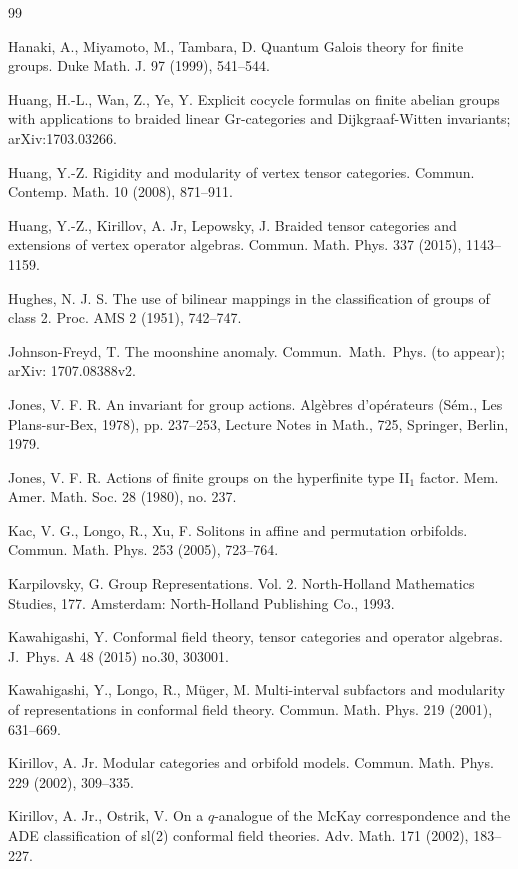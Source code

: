\documentclass[12pt]{article}
\numberwithin{equation}{section}
\begin{document}
\begin{thebibliography}{99}
\begin{scriptsize}
 {Hanaki, A., Miyamoto, M., Tambara, D.} {Quantum Galois theory for finite groups.} {Duke Math. J.} {97} (1999), 541--544.


 {Huang, H.-L., Wan, Z., Ye, Y.} {Explicit cocycle formulas on finite abelian groups with applications to braided linear Gr-categories and Dijkgraaf-Witten invariants;} arXiv:1703.03266. 

  {Huang, Y.-Z.} {Rigidity and modularity of vertex tensor categories.} {Commun. Contemp. Math.} 10 (2008), 871--911. 


 {Huang, Y.-Z., Kirillov, A. Jr, Lepowsky, J.} {Braided tensor categories and
extensions of vertex operator algebras.} Commun. Math. Phys.
337 (2015), 1143--1159. %

 {Hughes, N. J. S.} {The use of bilinear mappings in the classification of groups of class 2.} {Proc. AMS} 2 (1951), 742--747.


 {Johnson-Freyd, T.} {The moonshine anomaly.} {Commun.\ Math.\ Phys.} (to appear); arXiv: 1707.08388v2.

 {Jones, V. F. R.}  {An invariant for group actions.} {Alg\`ebres d'op\'erateurs (S\'em., Les Plans-sur-Bex, 1978),} pp. 237--253, {Lecture Notes in Math., 725, Springer, Berlin, 1979.} 

 {Jones, V. F. R.}  {Actions of finite groups on the hyperfinite type II$_1$ factor.} {Mem. Amer. Math. Soc.} 28 (1980), no. 237.


 {Kac, V. G., Longo, R., Xu, F.} {Solitons in affine and permutation orbifolds.} {Commun. Math. Phys.} {253 (2005), 723--764.}

 {Karpilovsky, G.}  {Group Representations. Vol. 2.} North-Holland Mathematics Studies, 177. Amsterdam: North-Holland Publishing Co., 1993.


 {Kawahigashi, Y.} {Conformal field theory, tensor categories and operator algebras.} {J.\ Phys. A 48} (2015) no.30, 303001. 

 {Kawahigashi, Y., Longo, R., M\"uger, M.} {Multi-interval subfactors and modularity of representations in conformal field theory.} {Commun. Math. Phys.} 219 (2001),  631--669.



 {Kirillov, A. Jr.}
{Modular categories and orbifold models.}
Commun. Math. Phys. 229 (2002), 309--335. 

 {Kirillov, A. Jr., Ostrik, V.} {On a $q$-analogue of the McKay correspondence and the ADE classification of sl(2) conformal field theories.} {Adv. Math.} 171 (2002), 183--227.



\end{scriptsize}
\end{thebibliography}
\end{document}
